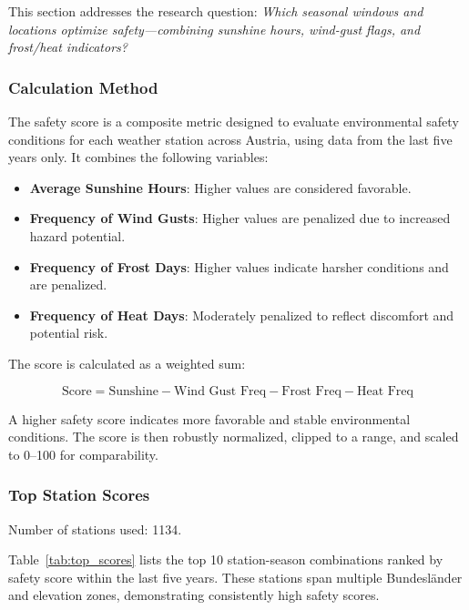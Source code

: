 This section addresses the research question: \textit{Which seasonal windows and locations optimize safety—combining sunshine hours, wind-gust flags, and frost/heat indicators?}

\subsubsection{Calculation Method}

The safety score is a composite metric designed to evaluate environmental
safety conditions for each weather station across Austria, using data from the
last five years only. It combines the following variables:

\begin{itemize}
    \item \textbf{Average Sunshine Hours}: Higher values are considered favorable.
    \item \textbf{Frequency of Wind Gusts}: Higher values are penalized due to increased hazard potential.
    \item \textbf{Frequency of Frost Days}: Higher values indicate harsher conditions and are penalized.
    \item \textbf{Frequency of Heat Days}: Moderately penalized to reflect discomfort and potential risk.
\end{itemize}

The score is calculated as a weighted sum:

\begin{equation}
    \text{Score} = \text{Sunshine} - \text{Wind Gust Freq} - \text{Frost Freq} - \text{Heat Freq}
\end{equation}

A higher safety score indicates more favorable and stable environmental
conditions. The score is then robustly normalized, clipped to a range, and
scaled to 0–100 for comparability.

\subsubsection{Top Station Scores}

Number of stations used: 1134.

Table~\ref{tab:top_scores} lists the top 10 station-season combinations ranked
by safety score within the last five years. These stations span multiple
Bundesländer and elevation zones, demonstrating consistently high safety
scores.

